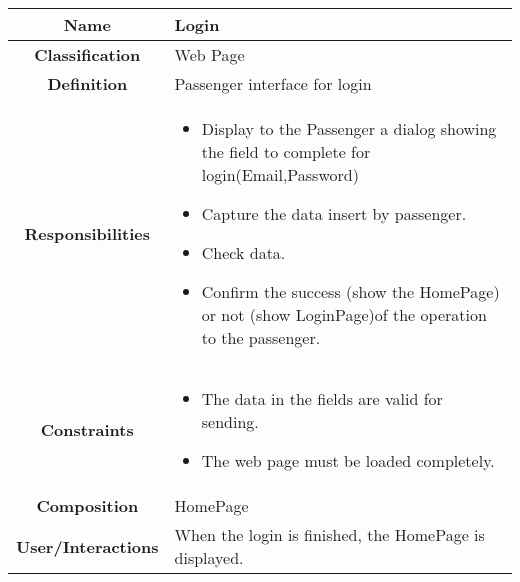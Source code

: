 \documentclass[11pt, a4paper,titlepage]{article}
\begin{document}
\begin{enumerate}
\begin{tabularx}{\textwidth}{| c | X |}
		\hline
		\textbf{Name} & 
		Login
		\\
		\hline
		\textbf{Classification} & 
		Web Page
		\\
		\hline
		\textbf{Definition} & 
		Passenger interface for login
		\\
		\hline
		\textbf{Responsibilities} &
		\begin{itemize}
			\item Display to the Passenger a dialog showing the field to             complete for login(Email,Password)
			\item  Capture the data insert by passenger.
			\item Check data.
			\item Confirm the success (show the HomePage) or not (show             LoginPage)of the operation to the passenger.
		\end{itemize}
		\\
		\hline
		\textbf{Constraints} & 
		\begin{itemize}
			\item  The data in the fields are valid for sending.
			\item The web page must be loaded completely.
		\end{itemize}
		\\
		\hline
		\textbf{Composition} & 
		HomePage
		\\
		\hline
		\textbf{User/Interactions} & 
	When the login is finished, the HomePage is displayed.
		\\
		\hline	
	\end{tabularx}


\end{enumerate}
\end{document}
